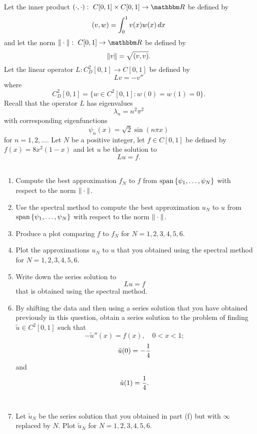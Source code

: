 
Let the inner product $\ip{\cdot,\cdot}:\mbox{ }C[0,1]\times C[0,1]\rightarrow\R$ be defined by
\[
(v,w)=\int_0^1v(x)w(x)\,dx
\]
and let the norm $\norm{\cdot}:\mbox{ }C[0,1]\rightarrow\R$ be defined by
\[
\|v\|=\sqrt{(v,v)}.
\]
Let the linear operator $L: C^2_D[0,1]\to C[0,1]$ be defined by
\[
L v = -v''
\]
where
\[
C^2_D[0,1] = \{ w \in C^2[0,1] : w(0) = w(1) = 0\}.
\]
Recall that the operator $L$ has eigenvalues
\[
\lambda_n = n^2 \pi^2
\]
with corresponding eigenfunctions
\[
\psi_n(x) = \sqrt{2} \sin(n \pi x)
\]
for $n=1,2,\ldots$. Let $N$ be a positive integer, let $f\in C[0,1]$ be defined by $f(x) = 8x^2(1-x)$ and let $u$ be the solution to
\[
Lu=f.
\]
\\
\begin{enumerate}
\item Compute the best approximation $f_N$ to $f$ from ${\rm span}\left\{\psi_1,\ldots,\psi_N\right\}$ with respect to the norm $\|\cdot\|$.
\\
\item Use the spectral method to compute the best approximation $u_N$ to $u$ from ${\rm span}\left\{\psi_1,\ldots,\psi_N\right\}$ with respect to the norm $\|\cdot\|$.
\\
\item Produce a plot comparing $f$ to $f_N$ for $N=1,2,3,4,5,6$.
\\
\item Plot the approximations $u_N$ to $u$ that you obtained using the spectral method for $N=1,2,3,4,5,6$.
\\
\item Write down the series solution to
\[
Lu=f
\]
that is obtained using the spectral method.
\\
\item By shifting the data and then using a series solution that you have obtained previously in this question, obtain a series solution to the problem of finding $\tilde{u}\in C^2[0,1]$ such that
\[
-\tilde{u}''(x)=f(x),\quad 0<x<1;
\]
\[
\tilde{u}(0) = -{1\over 4}
\]
and
\[
\tilde{u}(1) = {1\over 4}.
\]
\\
\item Let $\tilde{u}_N$ be the series solution that you obtained in part (f) but with $\infty$ replaced by $N$. Plot $\tilde{u}_N$ for $N=1,2,3,4,5,6$.
\end{enumerate}

           


